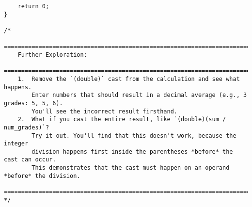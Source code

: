 \documentclass[11pt]{book}
\begin{document}
\begin{verbatim}
    return 0;
}

/*
    ================================================================================
    Further Exploration:
    ================================================================================
    1.  Remove the `(double)` cast from the calculation and see what happens.
        Enter numbers that should result in a decimal average (e.g., 3 grades: 5, 5, 6).
        You'll see the incorrect result firsthand.
    2.  What if you cast the entire result, like `(double)(sum / num_grades)`?
        Try it out. You'll find that this doesn't work, because the integer
        division happens first inside the parentheses *before* the cast can occur.
        This demonstrates that the cast must happen on an operand *before* the division.
    ================================================================================
*/

\end{verbatim}
\clearpage
\end{document}
